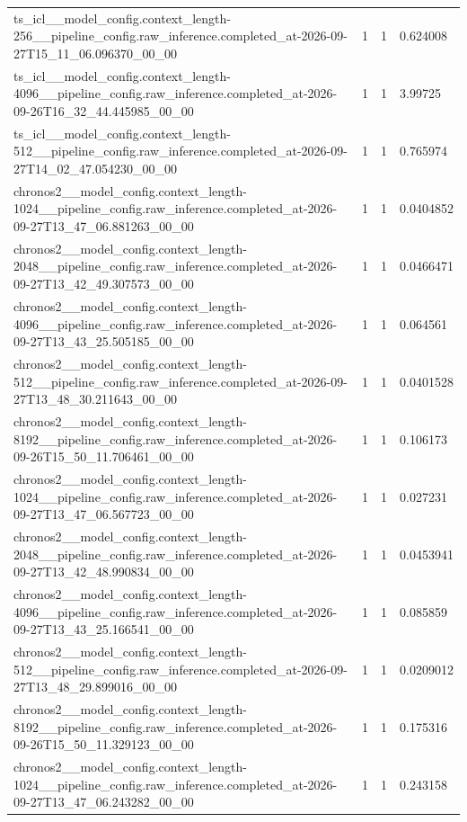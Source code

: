 \begin{tabular}{llll}
ts\_icl\_\_model\_config.context\_length-256\_\_pipeline\_config.raw\_inference.completed\_at-2026-09-27T15\_11\_06.096370\_00\_00 & 1 & 1 & 0.624008 \\
ts\_icl\_\_model\_config.context\_length-4096\_\_pipeline\_config.raw\_inference.completed\_at-2026-09-26T16\_32\_44.445985\_00\_00 & 1 & 1 & 3.99725 \\
ts\_icl\_\_model\_config.context\_length-512\_\_pipeline\_config.raw\_inference.completed\_at-2026-09-27T14\_02\_47.054230\_00\_00 & 1 & 1 & 0.765974 \\
chronos2\_\_model\_config.context\_length-1024\_\_pipeline\_config.raw\_inference.completed\_at-2026-09-27T13\_47\_06.881263\_00\_00 & 1 & 1 & 0.0404852 \\
chronos2\_\_model\_config.context\_length-2048\_\_pipeline\_config.raw\_inference.completed\_at-2026-09-27T13\_42\_49.307573\_00\_00 & 1 & 1 & 0.0466471 \\
chronos2\_\_model\_config.context\_length-4096\_\_pipeline\_config.raw\_inference.completed\_at-2026-09-27T13\_43\_25.505185\_00\_00 & 1 & 1 & 0.064561 \\
chronos2\_\_model\_config.context\_length-512\_\_pipeline\_config.raw\_inference.completed\_at-2026-09-27T13\_48\_30.211643\_00\_00 & 1 & 1 & 0.0401528 \\
chronos2\_\_model\_config.context\_length-8192\_\_pipeline\_config.raw\_inference.completed\_at-2026-09-26T15\_50\_11.706461\_00\_00 & 1 & 1 & 0.106173 \\
chronos2\_\_model\_config.context\_length-1024\_\_pipeline\_config.raw\_inference.completed\_at-2026-09-27T13\_47\_06.567723\_00\_00 & 1 & 1 & 0.027231 \\
chronos2\_\_model\_config.context\_length-2048\_\_pipeline\_config.raw\_inference.completed\_at-2026-09-27T13\_42\_48.990834\_00\_00 & 1 & 1 & 0.0453941 \\
chronos2\_\_model\_config.context\_length-4096\_\_pipeline\_config.raw\_inference.completed\_at-2026-09-27T13\_43\_25.166541\_00\_00 & 1 & 1 & 0.085859 \\
chronos2\_\_model\_config.context\_length-512\_\_pipeline\_config.raw\_inference.completed\_at-2026-09-27T13\_48\_29.899016\_00\_00 & 1 & 1 & 0.0209012 \\
chronos2\_\_model\_config.context\_length-8192\_\_pipeline\_config.raw\_inference.completed\_at-2026-09-26T15\_50\_11.329123\_00\_00 & 1 & 1 & 0.175316 \\
chronos2\_\_model\_config.context\_length-1024\_\_pipeline\_config.raw\_inference.completed\_at-2026-09-27T13\_47\_06.243282\_00\_00 & 1 & 1 & 0.243158 \\

\end{tabular}
